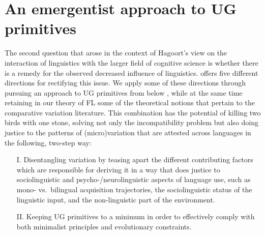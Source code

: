 \documentclass[output=paper]{langsci/langscibook}
\begin{document}
\section{An emergentist approach to UG primitives}\label{sec:25:2}

The second question that arose in the context of Hagoort’s view on the
interaction of linguistics with the larger field of cognitive science is
whether there is a remedy for the observed decreased influence of linguistics.
\citet{Hagoort2014} offers five different directions for rectifying this issue.
We apply some of these directions through pursuing an approach to \gls{UG}
primitives from below \citep{Chomsky2007}, while at the same time retaining in
our theory of \gls{FL} some of the theoretical notions that pertain to the
comparative variation literature. This combination has the potential of killing
two birds with one stone, solving not only the incompatibility problem but also
doing justice to the patterns of (micro)variation that are attested across
languages in the following, two-step way:\largerpage

\begin{itemize}

    \item[I.] Disentangling variation by teasing apart the different
        contributing factors which are responsible for deriving it in a way
        that does justice to sociolinguistic and psycho-/neurolinguistic
        aspects of language use, such as mono- vs.\ bilingual acquisition
        trajectories, the sociolinguistic status of the linguistic input, and
        the non-linguistic part of the environment.

    \item[II.] Keeping \gls{UG} primitives to a minimum in order to effectively
        comply with both minimalist principles and evolutionary constraints.

\end{itemize}
\end{document}
